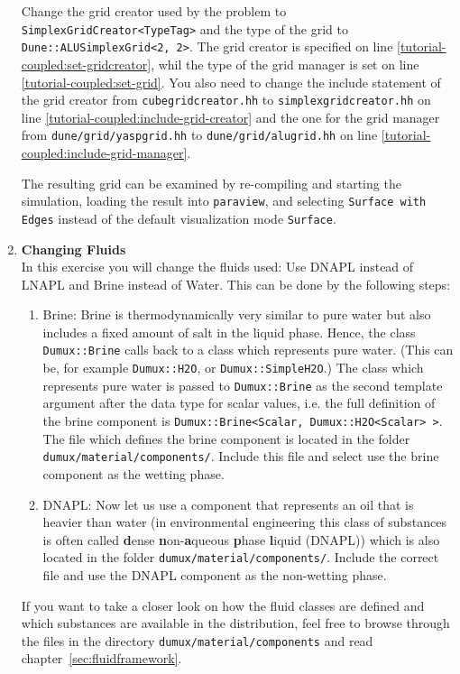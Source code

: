 \begin{enumerate}
  Change the grid creator used by the problem to
  \texttt{SimplexGridCreator<TypeTag>} and the type of the grid to
  \texttt{Dune::ALUSimplexGrid<2, 2>}. The grid creator is specified
  on line \ref{tutorial-coupled:set-gridcreator}, whil the type of the
  \Dune grid manager is set on line
  \ref{tutorial-coupled:set-grid}. You also need to change the include
  statement of the grid creator from \texttt{cubegridcreator.hh} to
  \texttt{simplexgridcreator.hh} on line
  \ref{tutorial-coupled:include-grid-creator} and the one for the grid
  manager from \texttt{dune/grid/yaspgrid.hh} to
  \texttt{dune/grid/alugrid.hh} on line \ref{tutorial-coupled:include-grid-manager}.

  The resulting grid can be examined by re-compiling and starting the
  simulation, loading the result into \texttt{paraview}, and selecting
  \texttt{Surface with Edges} instead of the default visualization
  mode \texttt{Surface}.

\item \textbf{Changing Fluids} \\
  In this exercise you will change the fluids used: Use DNAPL instead
  of LNAPL and Brine instead of Water. This can be done by the
  following steps:
\begin{enumerate}
\item Brine: Brine is thermodynamically very similar to pure water but
  also includes a fixed amount of salt in the liquid phase.  Hence,
  the class \texttt{Dumux::Brine} calls back to a class which
  represents pure water. (This can be, for example
  \texttt{Dumux::H2O}, or \texttt{Dumux::SimpleH2O}.) The class which
  represents pure water is passed to \texttt{Dumux::Brine} as the
  second template argument after the data type for scalar values,
  i.e. the full definition of the brine component is
  \texttt{Dumux::Brine<Scalar, Dumux::H2O<Scalar> >}. The file which
  defines the brine component is located in the folder
  \texttt{dumux/material/components/}.  Include this file and select
  use the brine component as the wetting phase.
\item DNAPL: Now let us use a component that represents an oil that
  is heavier than water (in environmental engineering this class of
  substances is often called \textbf{d}ense
  \textbf{n}on-\textbf{a}queous \textbf{p}hase \textbf{l}iquid
  (DNAPL)) which is also located in the folder
  \texttt{dumux/material/components/}. Include the correct file and
  use the DNAPL component as the non-wetting phase.
\end{enumerate}
If you want to take a closer look on how the fluid classes are defined
and which substances are available in the \eWoms distribution, feel
free to browse through the files in the directory
\texttt{dumux/material/components} and read
chapter~\ref{sec:fluidframework}.


\end{enumerate}

